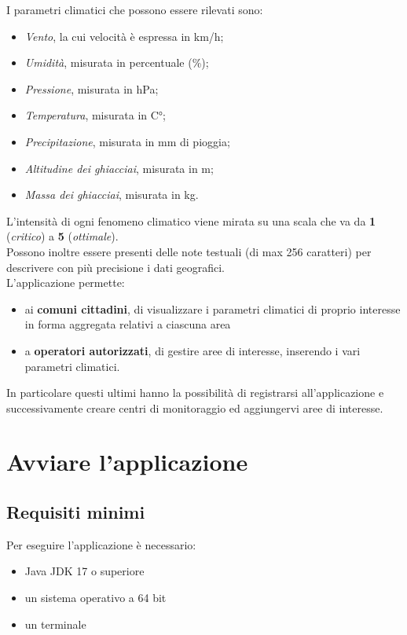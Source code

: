 \documentclass[12pt]{scrreprt}
\begin{document}
		I parametri climatici che possono essere rilevati sono:
		\begin{itemize}
		\item \textit{Vento}, la cui velocità è espressa in km/h;
		\item \textit{Umidità}, misurata in percentuale (\%);
		\item \textit{Pressione}, misurata in hPa;
		\item \textit{Temperatura}, misurata in C°;
		\item \textit{Precipitazione}, misurata in mm di pioggia;
		\item \textit{Altitudine dei ghiacciai}, misurata in m;
		\item \textit{Massa dei ghiacciai}, misurata in kg.
		\end{itemize}
		L'intensità di ogni fenomeno climatico viene mirata su una scala che va da \textbf{1} (\textit{critico}) a \textbf{5} (\textit{ottimale}).
		\\
		Possono inoltre essere presenti delle note testuali (di max 256 caratteri) per descrivere con più precisione i dati geografici.
		\\
		L'applicazione permette:
		\begin{itemize}
		\item ai \textbf{comuni cittadini}, di visualizzare i parametri climatici di proprio interesse in forma aggregata relativi a ciascuna area
		\item a \textbf{operatori autorizzati}, di gestire aree di interesse, inserendo i vari parametri climatici.
		\end{itemize}
		In particolare questi ultimi hanno la possibilità di registrarsi all'applicazione e successivamente creare centri di monitoraggio ed aggiungervi aree di interesse.

	\newpage

	\section{Avviare l'applicazione}

		\subsection{Requisiti minimi}
		Per eseguire l’applicazione è necessario:
		\begin{itemize}
			\item Java JDK 17 o superiore
			\item un sistema operativo a 64 bit
			\item un terminale
		\end{itemize}
\end{document}
